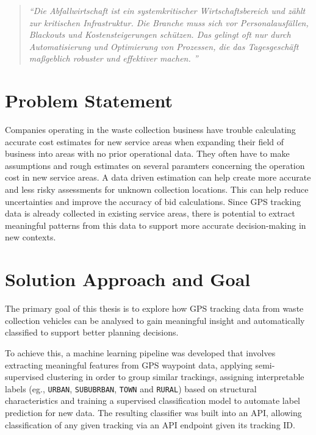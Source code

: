 \documentclass[a4paper,12pt,twoside]{scrreprt}
\begin{document}
\begin{quotation}
  \textit{
    ``Die Abfallwirtschaft ist ein systemkritischer Wirtschaftsbereich und
    zählt
    zur kritischen Infrastruktur. Die Branche muss sich vor Personalausfällen,
    Blackouts und Kostensteigerungen schützen. Das gelingt oft nur durch
    Automatisierung und Optimierung von Prozessen, die das Tagesgeschäft
    maßgeblich robuster und effektiver machen.
    ''\cite{noauthor_gemeinsam_nodate}}
\end{quotation}

\section{Problem Statement}

Companies operating in the waste collection business have trouble calculating
accurate cost estimates for new service areas when expanding their field of
business into
areas with no prior operational data.
They
often have to make assumptions and rough estimates on several paramters
concerning the operation cost in new service areas. A data driven estimation
can help create more accurate and less risky assessments for unknown collection
locations. This can help reduce uncertainties and improve the accuracy of bid
calculations.
Since GPS tracking data is already collected in existing service
areas, there is potential to extract meaningful patterns from this data to
support more accurate decision-making in new contexts.

\section{Solution Approach and Goal}

The primary goal of this thesis is to explore how GPS tracking data from waste
collection vehicles can be analysed to gain meaningful insight and
automatically classified to support better planning decisions.

To achieve this, a machine learning pipeline was developed that
involves extracting meaningful features from GPS waypoint data, applying
semi-supervised clustering in order to group similar trackings, assigning
interpretable labels (eg., \texttt{URBAN}, \texttt{SUBUBRBAN}, \texttt{TOWN}
and
\texttt{RURAL}) based on structural characteristics and training a supervised
classification model to automate label prediction for new data.
The resulting classifier was built into an API, allowing classification of any
given tracking via an API endpoint given its tracking ID.
\end{document}

